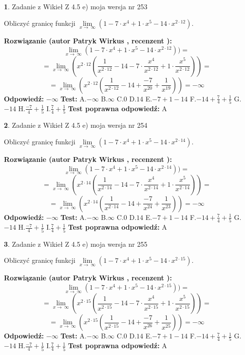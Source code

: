 \documentclass[12pt, a4paper]{article}
\theoremstyle{definition} %
\newtheorem{zad}{}
\newcommand{\zadStart}[1]{\begin{zad}#1\newline}
\newcommand{\zadStop}{\end{zad}}
\newcommand{\rozwStart}[2]{\noindent \textbf{Rozwiązanie (autor #1 , recenzent #2): }\newline}
\newcommand{\rozwStop}{\newline}
\newcommand{\odpStart}{\noindent \textbf{Odpowiedź:}\newline}
\newcommand{\odpStop}{\newline}
\newcommand{\testStart}{\noindent \textbf{Test:}\newline}
\newcommand{\testStop}{\newline}
\newcommand{\kluczStart}{\noindent \textbf{Test poprawna odpowiedź:}\newline}
\newcommand{\kluczStop}{\newline}
\begin{document}
\zadStart{Zadanie z Wikieł Z 4.5 e) moja wersja nr 253}



Obliczyć granicę funkcji  $\lim\limits_{x\to\ \infty}(1 - 7 \cdot x^{4}+1 \cdot x^{5}- 14 \cdot x^{2\cdot12})$.
\zadStop
\rozwStart{Patryk Wirkus}{}
$$\lim\limits_{x\to\ \infty}(1 - 7 \cdot x^{4}+1 \cdot x^{5}- 14 \cdot x^{2\cdot12}))=$$
$$=\lim\limits_{x\to\ \infty}(x^{2\cdot12}(\frac{1}{x^{2\cdot12}}-14 -7 \cdot \frac{x^{4}}{x^{2\cdot12}}+1 \cdot \frac{x^{5}}{x^{2\cdot12}}))=$$
$$=\lim\limits_{x\to\ \infty}(x^{2\cdot12}(\frac{1}{x^{2\cdot12}}-14 + \frac{-7}{x^{20}}+ \frac{1}{x^{19}}))=-\infty$$
\rozwStop
\odpStart
$-\infty$
\odpStop
\testStart
A.$-\infty$ B.$\infty$ C.$0$ D.$14$ E.$-7 + 1 - 14$
F.$-14+\frac{7}{4}+\frac{1}{5}$ G.$-14$
H.$\frac{-7}{4}+\frac{1}{5}$
I.$\frac{7}{4}+\frac{1}{5}$
\testStop
\kluczStart
A
\kluczStop



\zadStart{Zadanie z Wikieł Z 4.5 e) moja wersja nr 254}



Obliczyć granicę funkcji  $\lim\limits_{x\to\ \infty}(1 - 7 \cdot x^{4}+1 \cdot x^{5}- 14 \cdot x^{2\cdot14})$.
\zadStop
\rozwStart{Patryk Wirkus}{}
$$\lim\limits_{x\to\ \infty}(1 - 7 \cdot x^{4}+1 \cdot x^{5}- 14 \cdot x^{2\cdot14}))=$$
$$=\lim\limits_{x\to\ \infty}(x^{2\cdot14}(\frac{1}{x^{2\cdot14}}-14 -7 \cdot \frac{x^{4}}{x^{2\cdot14}}+1 \cdot \frac{x^{5}}{x^{2\cdot14}}))=$$
$$=\lim\limits_{x\to\ \infty}(x^{2\cdot14}(\frac{1}{x^{2\cdot14}}-14 + \frac{-7}{x^{24}}+ \frac{1}{x^{23}}))=-\infty$$
\rozwStop
\odpStart
$-\infty$
\odpStop
\testStart
A.$-\infty$ B.$\infty$ C.$0$ D.$14$ E.$-7 + 1 - 14$
F.$-14+\frac{7}{4}+\frac{1}{5}$ G.$-14$
H.$\frac{-7}{4}+\frac{1}{5}$
I.$\frac{7}{4}+\frac{1}{5}$
\testStop
\kluczStart
A
\kluczStop



\zadStart{Zadanie z Wikieł Z 4.5 e) moja wersja nr 255}



Obliczyć granicę funkcji  $\lim\limits_{x\to\ \infty}(1 - 7 \cdot x^{4}+1 \cdot x^{5}- 14 \cdot x^{2\cdot15})$.
\zadStop
\rozwStart{Patryk Wirkus}{}
$$\lim\limits_{x\to\ \infty}(1 - 7 \cdot x^{4}+1 \cdot x^{5}- 14 \cdot x^{2\cdot15}))=$$
$$=\lim\limits_{x\to\ \infty}(x^{2\cdot15}(\frac{1}{x^{2\cdot15}}-14 -7 \cdot \frac{x^{4}}{x^{2\cdot15}}+1 \cdot \frac{x^{5}}{x^{2\cdot15}}))=$$
$$=\lim\limits_{x\to\ \infty}(x^{2\cdot15}(\frac{1}{x^{2\cdot15}}-14 + \frac{-7}{x^{26}}+ \frac{1}{x^{25}}))=-\infty$$
\rozwStop
\odpStart
$-\infty$
\odpStop
\testStart
A.$-\infty$ B.$\infty$ C.$0$ D.$14$ E.$-7 + 1 - 14$
F.$-14+\frac{7}{4}+\frac{1}{5}$ G.$-14$
H.$\frac{-7}{4}+\frac{1}{5}$
I.$\frac{7}{4}+\frac{1}{5}$
\testStop
\kluczStart
A
\kluczStop
\end{document}
